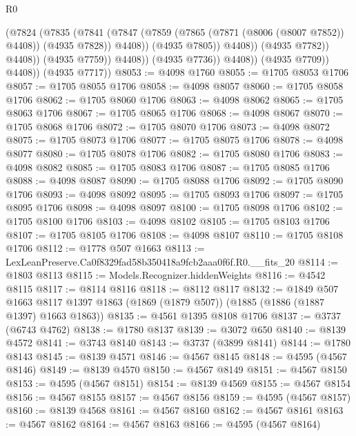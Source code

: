 \begin{lexlean}{R0}
\begin{coremodule}
                                (@7824
                                  (@7835
                                    (@7841
                                      (@7847
                                        (@7859
                                          (@7865 (@7871 (@8006 (@8007 @7852)) @4408))
                                          (@4935 @7828))
                                        @4408))
                                    (@4935 @7805))
                                  @4408))
                              (@4935 @7782))
                            @4408))
                        (@4935 @7759))
                      @4408))
                  (@4935 @7736))
                @4408))
            (@4935 @7709))
          @4408))
      (@4935 @7717))
@8053 := @4098 @1760
@8055 := @1705 @8053 @1706
@8057 := @1705 @8055 @1706
@8058 := @4098 @8057
@8060 := @1705 @8058 @1706
@8062 := @1705 @8060 @1706
@8063 := @4098 @8062
@8065 := @1705 @8063 @1706
@8067 := @1705 @8065 @1706
@8068 := @4098 @8067
@8070 := @1705 @8068 @1706
@8072 := @1705 @8070 @1706
@8073 := @4098 @8072
@8075 := @1705 @8073 @1706
@8077 := @1705 @8075 @1706
@8078 := @4098 @8077
@8080 := @1705 @8078 @1706
@8082 := @1705 @8080 @1706
@8083 := @4098 @8082
@8085 := @1705 @8083 @1706
@8087 := @1705 @8085 @1706
@8088 := @4098 @8087
@8090 := @1705 @8088 @1706
@8092 := @1705 @8090 @1706
@8093 := @4098 @8092
@8095 := @1705 @8093 @1706
@8097 := @1705 @8095 @1706
@8098 := @4098 @8097
@8100 := @1705 @8098 @1706
@8102 := @1705 @8100 @1706
@8103 := @4098 @8102
@8105 := @1705 @8103 @1706
@8107 := @1705 @8105 @1706
@8108 := @4098 @8107
@8110 := @1705 @8108 @1706
@8112 := @1778 @507 @1663
@8113 := LexLeanPreserve.Ca0f8329fad58b350418a9fcb2aaa0f6f.R0.__fits_20
@8114 := @1803 @8113
@8115 := Models.Recognizer.hiddenWeights
@8116 := @4542 @8115
@8117 := @8114 @8116
@8118 := @8112 @8117
@8132 := @1849
    @507
    @1663
    @8117
    @1397
    @1863
    (@1869 (@1879 @507))
    (@1885 (@1886 (@1887 @1397) @1663 @1863))
@8135 := @4561 @1395 @8108 @1706
@8137 := @3737 (@6743 @4762)
@8138 := @1780 @8137
@8139 := @3072 @650
@8140 := @8139 @4572
@8141 := @3743 @8140
@8143 := @3737 (@3899 @8141)
@8144 := @1780 @8143
@8145 := @8139 @4571
@8146 := @4567 @8145
@8148 := @4595 (@4567 @8146)
@8149 := @8139 @4570
@8150 := @4567 @8149
@8151 := @4567 @8150
@8153 := @4595 (@4567 @8151)
@8154 := @8139 @4569
@8155 := @4567 @8154
@8156 := @4567 @8155
@8157 := @4567 @8156
@8159 := @4595 (@4567 @8157)
@8160 := @8139 @4568
@8161 := @4567 @8160
@8162 := @4567 @8161
@8163 := @4567 @8162
@8164 := @4567 @8163
@8166 := @4595 (@4567 @8164)

\end{coremodule}
\end{lexlean}
